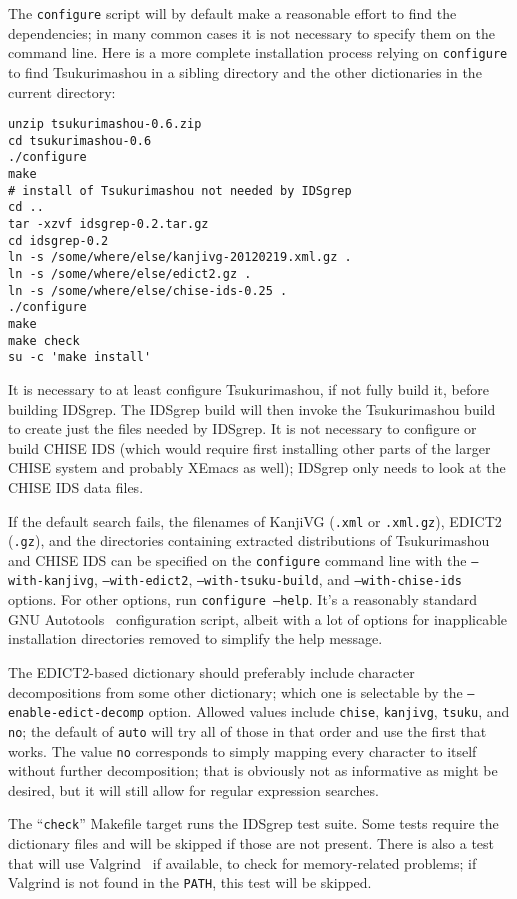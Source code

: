 \documentclass[twocolumn]{report}
\begin{document}
The \texttt{configure}
script will by default make a reasonable effort to find the dependencies; in
many common cases it is not necessary to specify them on the command line. 
Here is a more complete installation process relying on \texttt{configure}
to find Tsukurimashou in a
sibling directory and the other dictionaries in the current directory:
\begin{verbatim}
unzip tsukurimashou-0.6.zip
cd tsukurimashou-0.6
./configure
make
# install of Tsukurimashou not needed by IDSgrep
cd ..
tar -xzvf idsgrep-0.2.tar.gz
cd idsgrep-0.2
ln -s /some/where/else/kanjivg-20120219.xml.gz .
ln -s /some/where/else/edict2.gz .
ln -s /some/where/else/chise-ids-0.25 .
./configure
make
make check
su -c 'make install'
\end{verbatim}

It is necessary to at least configure Tsukurimashou, if not fully build it,
before building IDSgrep.  The IDSgrep build will then invoke the
Tsukurimashou build to create just the files needed by IDSgrep.  It is not
necessary to configure or build CHISE IDS (which would require first
installing other parts of the larger CHISE system and probably XEmacs as
well); IDSgrep only needs to look at the CHISE IDS data files.

If the default search fails, the filenames of KanjiVG (\texttt{.xml} or
\texttt{.xml.gz}), EDICT2 (\texttt{.gz}), and the directories containing
extracted distributions of Tsukurimashou and CHISE IDS can be
specified on the \texttt{configure} command line with
the \texttt{--with-kanjivg}, \texttt{--with-edict2},
\texttt{--with-tsuku-build}, and \texttt{--with-chise-ids} options.  For
other options, run \texttt{configure --help}.  It's a reasonably standard
GNU Autotools~\cite{Autotools} configuration script, albeit with a lot of
options for inapplicable installation directories removed to simplify the
help message.

The EDICT2-based dictionary should preferably include
character decompositions from some other dictionary; which one is
selectable by the \texttt{--enable-edict-decomp} option.  Allowed values
include \texttt{chise}, \texttt{kanjivg}, \texttt{tsuku}, and \texttt{no};
the default of \texttt{auto} will try all of those in that order and use the
first that works.  The value \texttt{no} corresponds to simply mapping every
character to itself without further decomposition; that is obviously not as
informative as might be desired, but it will still allow for regular
expression searches.

The ``\texttt{check}'' Makefile target runs the IDSgrep test suite.  Some
tests require the dictionary files and will be skipped if those are not
present.  There is also a test that will use Valgrind~\cite{Valgrind} if
available, to check for memory-related problems; if Valgrind is not found in
the \texttt{PATH}, this test will be skipped.
\end{document}
